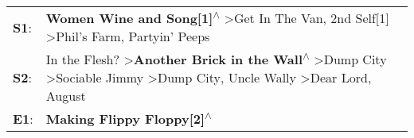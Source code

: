 \begin{supertabular}{p{0.03\textwidth}p{0.92\textwidth}}
 \textbf{S1}:  &                                                                                                                                                     \textbf{Women Wine and Song[1]\textsuperscript{$\wedge$}} \textgreater \enspace Get In The Van\textsuperscript{}, \enspace 2nd Self[1]\textsuperscript{} \textgreater \enspace Phil's Farm\textsuperscript{}, \enspace Partyin' Peeps\textsuperscript{}  \enspace  \\
 \textbf{S2}:  &  In the Flesh?\textsuperscript{} \textgreater \enspace \textbf{Another Brick in the Wall\textsuperscript{$\wedge$}} \textgreater \enspace Dump City\textsuperscript{} \textgreater \enspace Sociable Jimmy\textsuperscript{} \textgreater \enspace Dump City\textsuperscript{}, \enspace Uncle Wally\textsuperscript{} \textgreater \enspace Dear Lord\textsuperscript{}, \enspace August\textsuperscript{}  \enspace  \\
 \textbf{E1}:  &                                                                                                                                                                                                                                                                                                                                                  \textbf{Making Flippy Floppy[2]\textsuperscript{$\wedge$}}  \enspace  \\
\end{supertabular}
